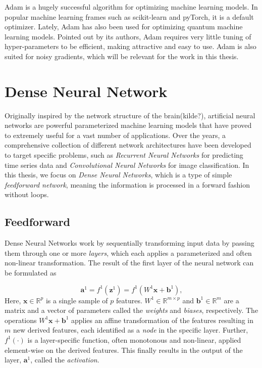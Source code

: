 Adam is a hugely successful algorithm for optimizing machine learning models. In popular machine learning frames such as scikit-learn\citet{scikit-learn} and pyTorch\citet{NEURIPS2019_9015}, it is a default optimizer. Lately, Adam has also been used for optimizing quantum machine learning models\citet{abbas2020power}\citet{skolik2020layerwise}. Pointed out by its authors, Adam requires very little tuning of hyper-parameters to be efficient, making attractive and easy to use. Adam is also suited for noisy gradients, which will be relevant for the work in this thesis. 



\section{Dense Neural Network}\label{sec:DenseNeuralNetwork}
Originally inspired by the network structure of the brain(kilde?), artificial neural networks are powerful parameterized machine learning models that have proved to extremely useful for a vast number of applications. Over the years, a comprehensive collection of different network architectures have been developed to target specific problems, such as \emph{Recurrent Neural Networks} for predicting time series data and \emph{Convolutional Neural Networks} for image classification. In this thesis, we focus on \emph{Dense Neural Networks}, which is a type of simple \emph{feedforward network}, meaning the information is processed in a forward fashion without loops.

\subsection{Feedforward}\label{sec:FeedforwardDNN}
Dense Neural Networks work by sequentially transforming input data by passing them through one or more \emph{layers}, which each applies a parameterized and often non-linear transformation. The result of the first layer of the neural network can be formulated as

\begin{equation}\label{eq:FeedforwardSingle}
    \boldsymbol{a}^1 = f^1(\boldsymbol{z}^1) = f^1(W^1 \boldsymbol{x} + \boldsymbol{b}^1),
\end{equation}
Here, $\boldsymbol{x} \in \mathbb{R}^p$ is a single sample of $p$ features. $W^1 \in \mathbb{R}^{m \times p}$ and $\boldsymbol{b}^1 \in \mathbb{R}^{m}$ are a matrix and a vector of parameters called the \emph{weights} and \emph{biases}, respectively. The operations $W^1 \boldsymbol{x} + \boldsymbol{b}^1$ applies an affine transformation of the features resulting in $m$ new derived features, each identified as a \emph{node} in the specific layer. Further, $f^1(\cdot)$ is a layer-specific function, often monotonous and non-linear, applied element-wise on the derived features. This finally results in the output of the layer, $\boldsymbol{a}^1$, called the \emph{activation}.

